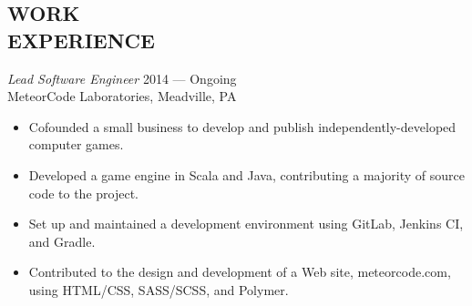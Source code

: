 \documentclass[margin]{res}
\begin{document}
\begin{resume}
\section{WORK \\ EXPERIENCE} 

                {\sl Lead Software Engineer} \hfill  2014 --- Ongoing \\
                MeteorCode Laboratories, Meadville, PA
                 \begin{itemize}  \itemsep -2pt %
                    \item Cofounded a small business to develop and publish independently-developed computer games. 
                    \item Developed a game engine in Scala and Java, contributing a majority of source code to the project.
                    \item Set up and maintained a development environment using GitLab, Jenkins CI, and Gradle.
		\item Contributed to the design and development of a Web site, meteorcode.com, using HTML/CSS, SASS/SCSS, and Polymer.
                 \end{itemize}
                
 


\end{resume}
\end{document}
